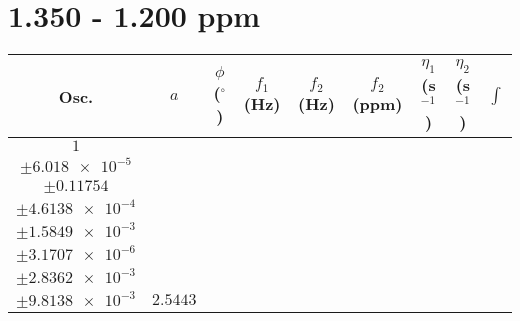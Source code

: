 \documentclass[8pt]{article}
\begin{document}
\section*{1.350 - 1.200 ppm}
\begin{longtable}[l]{c c c c c c c c c}
\toprule
Osc. & $a$ & $\phi$ ($^{\circ}$) & $f_1$ (Hz) & $f_2$ (Hz) & $f_2$ (ppm) & $\eta_1$ (s$^{-1}$) & $\eta_2$ (s$^{-1}$) & $\int$\\
\midrule
$\num{1}$ & \begin{tabular}[c]{@{}c@{}}$\num{2.9839e-2}$ \\ $\pm\num{6.018e-5}$\end{tabular} & \begin{tabular}[c]{@{}c@{}}$\num{-0.14207}$ \\ $\pm\num{0.11754}$\end{tabular} & \begin{tabular}[c]{@{}c@{}}$\num{-8.5035}$ \\ $\pm\num{4.6138e-4}$\end{tabular} & \begin{tabular}[c]{@{}c@{}}$\num{629.37}$ \\ $\pm\num{1.5849e-3}$\end{tabular} & \begin{tabular}[c]{@{}c@{}}$\num{1.2591}$ \\ $\pm\num{3.1707e-6}$\end{tabular} & \begin{tabular}[c]{@{}c@{}}$\num{1.1526}$ \\ $\pm\num{2.8362e-3}$\end{tabular} & \begin{tabular}[c]{@{}c@{}}$\num{4.18}$ \\ $\pm\num{9.8138e-3}$\end{tabular} & $\num{2.5443}$\\

\end{longtable}
\end{document}
